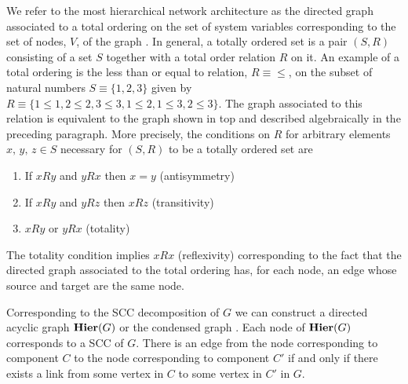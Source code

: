  We refer to the most hierarchical network architecture as the directed graph associated to a total ordering on the set of system variables corresponding to the set of nodes, $V$, of the graph \cite{Cormen2009}. In general, a totally ordered set is a pair $(S,R)$ consisting of a set $S$ together with a total order relation $R$ on it. An example of a total ordering is the less than or equal to relation, $R \equiv \leq$, on the subset of natural numbers $S \equiv \{1,2,3\}$ given by $R \equiv \{1 \leq 1, 2 \leq 2, 3 \leq 3, 1 \leq 2, 1 \leq 3, 2 \leq 3\}$. The graph associated to this relation is equivalent to the graph shown in  top and described algebraically in the preceding paragraph. More precisely, the conditions on $R$ for arbitrary elements $x,\,y,\,z \in S$ necessary for $(S,R)$ to be a totally ordered set are
\begin{enumerate}
\item If $x R y$ and $y R x$ then $x=y$ (antisymmetry)
\item If $x R y$ and $y R z$ then $x R z$ (transitivity)
\item $x R y$ or $y R x$ (totality)
\end{enumerate}
The totality condition implies $x R x$ (reflexivity) corresponding to the fact that the directed graph associated to the total ordering has, for each node, an edge whose source and target are the same node.

Corresponding to the SCC decomposition of $G$ we can construct a directed acyclic graph $\mathbf{Hier} (G)$ or the condensed graph \cite{Corominas-Murtra2013}.  Each node of $\mathbf{Hier} (G)$ corresponds to a SCC of $G$. There is an edge from the node corresponding to component $C$ to the node corresponding to component $C'$ if and only if there exists a link from some vertex in $C$ to some vertex in $C'$ in $G$.



